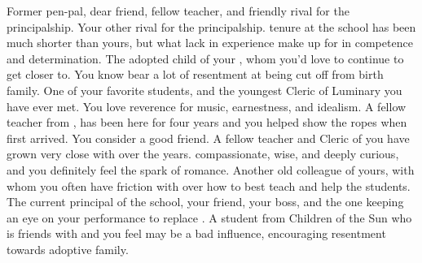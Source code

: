 \documentclass[char]{GL2020}
\begin{document}
\begin{contacts}
    \contact{\cBeetle{}} Former pen-pal, dear friend, fellow teacher, and friendly rival for the principalship.
    \contact{\cChupSecond{}} Your other rival for the principalship. \cChupSecond{\Their} tenure at the school has been much shorter than yours, but what \cChupSecond{\they} lack in experience \cChupSecond{\they} make up for in competence and determination.
    \contact{\cAdopted{}} The adopted child of your \cAdoptedParentOne{\nibling}, whom you'd love to continue to get closer to. You know \cAdopted{\they} bear a lot of resentment at being cut off from \cAdopted{\their} birth family.
    \contact{\cDisney{}} One of your favorite students, and the youngest Cleric of Luminary you have ever met. You love \cDisney{\their} reverence for music, earnestness, and idealism.
    \contact{\cInterpol{}} A fellow teacher from \pFarm{}, \cInterpol{} has been here for four years and you helped show \cInterpol{\them} the ropes when \cInterpol{\they} first arrived. You consider \cInterpol{\them} a good friend.
    \contact{\cFlowPriest{}} A fellow teacher and Cleric of \cFlow{} you have grown very close with over the years. \cFlowPriest{\Theyare} compassionate, wise, and deeply curious, and you definitely feel the spark of romance.
    \contact{\cEthics{}} Another old colleague of yours, with whom you often have friction with over how to best teach and help the students.
    \contact{\cPrincipal{}} The current principal of the school, your friend, your boss, and the one keeping an eye on your performance to replace \cPrincipal{\them}.
    \contact{\cLibAssist{}} A student from Children of the Sun who is friends with \cAdopted{} and you feel may be a bad influence, encouraging \cAdopted{\their} resentment towards \cAdopted{\their} adoptive family.
\end{contacts}
\end{document}
